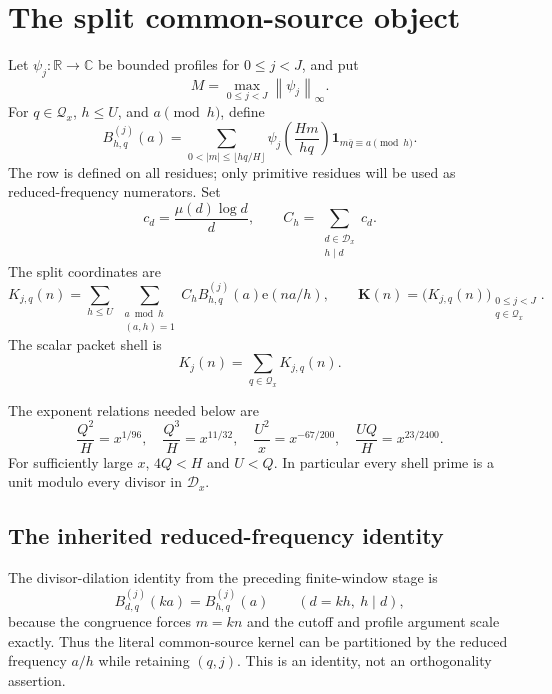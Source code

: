 \documentclass[11pt]{article}
\theoremstyle{remark}
\newcommand{\Qx}{\mathcal Q_x}
\newcommand{\Dx}{\mathcal D_x}
\newcommand{\one}{\mathbf 1}
\newcommand{\ee}{\mathrm e}
\newcommand{\Kvec}{\mathbf K}
\newcommand{\Kj}{K_j}
\newcommand{\Kjq}{K_{j,q}}
\newcommand{\norm}[1]{\left\lVert #1\right\rVert}
\begin{document}
\section{The split common-source object}

Let $\psi_j:\mathbb R\to\mathbb C$ be bounded profiles for
$0\leq j<J$, and put
\[
 M=\max_{0\leq j<J}\norm{\psi_j}_\infty.
\]
For $q\in\Qx$, $h\leq U$, and $a\pmod h$, define
\begin{equation}
 B_{h,q}^{(j)}(a)
 =
 \sum_{0<|m|\leq \lfloor hq/H\rfloor}
 \psi_j\!\left(\frac{Hm}{hq}\right)
 \one_{m\overline q\equiv a\pmod h}.
 \label{eq:row}
\end{equation}
The row is defined on all residues; only primitive residues will be used as
reduced-frequency numerators.  Set
\begin{equation}
 c_d=\frac{\mu(d)\log d}{d},\qquad
 C_h=\sum_{\substack{d\in\Dx\\h\mid d}}c_d.
 \label{eq:coeff}
\end{equation}
The split coordinates are
\begin{equation}
 \Kjq(n)=
 \sum_{h\leq U}\ \sum_{\substack{a\bmod h\\(a,h)=1}}
 C_h B_{h,q}^{(j)}(a)\ee(na/h),
 \qquad
 \Kvec(n)=\bigl(\Kjq(n)\bigr)_{\substack{0\leq j<J\\q\in\Qx}}.
 \label{eq:split}
\end{equation}
The scalar packet shell is
\begin{equation}
 \Kj(n)=\sum_{q\in\Qx}\Kjq(n).
 \label{eq:scalar}
\end{equation}

The exponent relations needed below are
\begin{equation}
 \frac{Q^2}{H}=x^{1/96},\quad
 \frac{Q^3}{H}=x^{11/32},\quad
 \frac{U^2}{x}=x^{-67/200},\quad
 \frac{UQ}{H}=x^{23/2400}.
 \label{eq:exponents}
\end{equation}
For sufficiently large $x$, $4Q<H$ and $U<Q$.  In particular every shell
prime is a unit modulo every divisor in $\Dx$.

\subsection{The inherited reduced-frequency identity}

The divisor-dilation identity from the preceding finite-window stage is
\begin{equation}
 B_{d,q}^{(j)}(ka)=B_{h,q}^{(j)}(a)
 \qquad (d=kh,\ h\mid d),
 \label{eq:dilation}
\end{equation}
because the congruence forces $m=kn$ and the cutoff and profile argument
scale exactly.  Thus the literal common-source kernel can be partitioned by
the reduced frequency $a/h$ while retaining $(q,j)$.  This is an identity,
not an orthogonality assertion.
\end{document}
